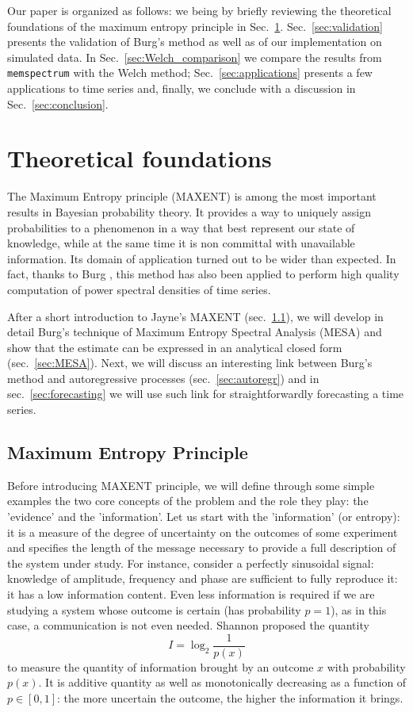 \documentclass[twocolumn,showpacs,preprintnumbers,nofootinbib,prd,
superscriptaddress,10pt]{revtex4-1}
\begin{document}
Our paper is organized as follows: we being by briefly reviewing the theoretical foundations of the maximum entropy principle in Sec.~\ref{sec:foundations}. Sec.~\ref{sec:validation} presents the validation of Burg's method as well as of our implementation on simulated data. In Sec.~\ref{sec:Welch_comparison} we compare the results from \texttt{memspectrum} with the Welch method; Sec.~\ref{sec:applications} presents a few applications to time series and, finally, we conclude with a discussion in Sec.~\ref{sec:conclusion}.


\section{Theoretical foundations}\label{sec:foundations}
The Maximum Entropy principle (MAXENT) is among the most important results in Bayesian probability theory. It provides a way to uniquely assign probabilities to a phenomenon in a way that best represent our state of knowledge, while at the same time it is non committal with unavailable information. Its domain of application turned out to be wider than expected. In fact, thanks to Burg \cite{burg1975maximum}, this method has also been applied to perform high quality computation of power spectral densities of time series.

After a short introduction to Jayne's MAXENT (sec.~\ref{sec:MAXENT}), we will develop in detail Burg's technique of Maximum Entropy Spectral Analysis (MESA) and show that the estimate can be expressed in an analytical closed form (sec.~\ref{sec:MESA}).
Next, we will discuss an interesting link between Burg's method and autoregressive processes (sec.~\ref{sec:autoregr}) and in sec.~\ref{sec:forecasting} we will use such link for straightforwardly forecasting a time series.

\subsection{Maximum Entropy Principle} \label{sec:MAXENT}

Before introducing MAXENT principle, we will define through some simple examples the two core concepts of the problem and the role they play: the 'evidence' and the 'information'.
Let us start with the 'information' (or entropy): it is a measure of the degree of uncertainty on the outcomes of some experiment and specifies the length of the message necessary to provide a full description of the system under study. For instance, consider a perfectly sinusoidal signal: knowledge of amplitude, frequency and phase are sufficient to fully reproduce it: it has a low information content. Even less information is required if we are studying a system whose outcome is certain (has probability $p = 1$), as in this case, a communication is not even needed.  
Shannon \cite{Shannon} proposed the quantity
\begin{equation}\label{eq:information}
    I = \log_2 \frac{1}{p(x)}
\end{equation}
to measure the quantity of information brought by an outcome $x$ with probability $p(x)$. It is additive quantity as well as monotonically decreasing as a function of $p \in [0, 1]$: the more uncertain the outcome, the higher the information it brings.
\end{document}
